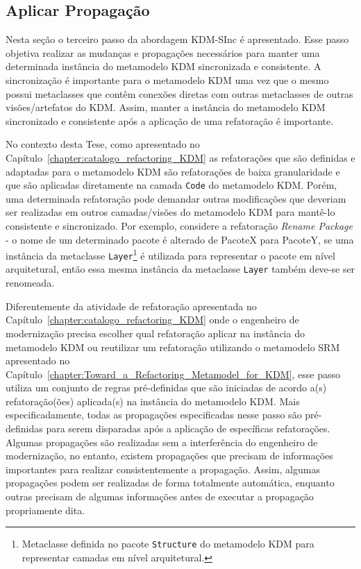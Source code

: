 \subsection{Aplicar Propagação}\label{subsec:aplicar_propagacao_KDM-SInc}
Nesta seção o terceiro passo da abordagem KDM-SInc é apresentado. Esse passo objetiva realizar as mudanças e propagações necessários para manter uma determinada instância do metamodelo KDM sincronizada e consistente. A sincronização é importante para o metamodelo KDM uma vez que o mesmo possui metaclasses que contêm conexões diretas com outras metaclasses de outras visões/artefatos do KDM. Assim, manter a instância do metamodelo KDM sincronizado e consistente após a aplicação de uma refatoração é importante. 

No contexto desta Tese, como apresentado no Capítulo~\ref{chapter:catalogo_refactoring_KDM} as refatorações que são definidas e adaptadas para o metamodelo KDM são refatorações de baixa granularidade e que são aplicadas diretamente na camada \texttt{Code} do metamodelo KDM. Porém, uma determinada refatoração pode demandar outras modificações que deveriam ser realizadas em outros camadas/visões do metamodelo KDM para mantê-lo consistente e sincronizado. Por exemplo, considere a refatoração \textit{Rename Package} - o nome de um determinado pacote é alterado de PacoteX para PacoteY, se uma instância da metaclasse \texttt{Layer}\footnote{Metaclasse definida no pacote \texttt{Structure} do metamodelo KDM para representar camadas em nível arquitetural.} é utilizada para representar o pacote em nível arquitetural, então essa mesma instância da metaclasse \texttt{Layer} também deve-se ser renomeada. 

Diferentemente da atividade de refatoração apresentada no Capítulo~\ref{chapter:catalogo_refactoring_KDM} onde o engenheiro de modernização precisa escolher qual refatoração aplicar na instância do metamodelo KDM ou reutilizar um refatoração utilizando o metamodelo SRM apresentado no Capítulo~\ref{chapter:Toward_a_Refactoring_Metamodel_for_KDM}, esse passo utiliza um conjunto de regras pré-definidas que são iniciadas de acordo a(s) refatoração(ões) aplicada(s) na instância do metamodelo KDM. Mais especificadamente, todas as propagações especificadas nesse passo são pré-definidas para serem disparadas após a aplicação de específicas refatorações. Algumas propagações são realizadas sem a interferência do engenheiro de modernização, no entanto, existem propagações que precisam de informações importantes para realizar consistentemente a propagação. Assim, algumas propagações podem ser realizadas de forma totalmente automática, enquanto outras precisam de algumas informações antes de executar a propagação propriamente dita.

